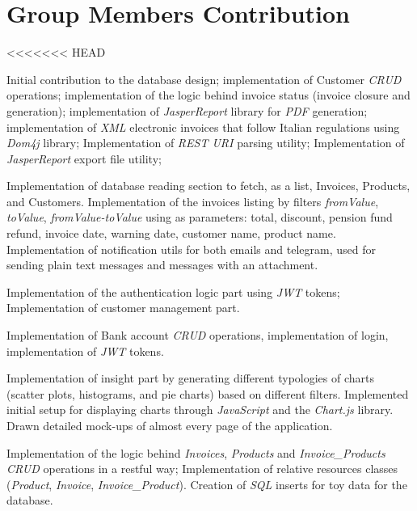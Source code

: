 \newpage
\section{Group Members Contribution}


\begin{description}
<<<<<<< HEAD
	\item[Mirco Cazzaro] Initial contribution to the database design; implementation of Customer \textit{CRUD} operations; implementation of the logic behind invoice status (invoice closure and generation); implementation of \textit{JasperReport} library for \textit{PDF} generation; implementation of \textit{XML} electronic invoices that follow Italian regulations using \textit{Dom4j} library; Implementation of \textit{REST URI} parsing utility; Implementation of \textit{JasperReport} export file utility;
	\item[Marco Martinelli] Implementation of database reading section to fetch, as a list, Invoices, Products, and Customers. 
    Implementation of the invoices listing by filters \textit{fromValue}, \textit{toValue}, \textit{fromValue-toValue} using as parameters: total, discount, pension fund refund, invoice date, warning date, customer name, product name.
    Implementation of notification utils for both emails and telegram, used for sending plain text messages and messages with an attachment.  
	\item[Farzad Shami] Implementation of the authentication logic part using \textit{JWT} tokens; Implementation of customer management part.
	\item[Nicola Boscolo Cegion] Implementation of Bank account \textit{CRUD} operations, implementation of login, implementation of \textit{JWT} tokens.
	\item[Christian Marchiori] Implementation of insight part by generating different typologies of charts (scatter plots, histograms, and pie charts) based on different filters. Implemented initial setup for displaying charts through \textit{JavaScript} and the \textit{Chart.js} library. Drawn detailed mock-ups of almost every page of the application.
	\item[Fabio Zanini] Implementation of the logic behind \textit{Invoices}, \textit{Products} and \textit{Invoice\_Products} \textit{CRUD} operations in a restful way; Implementation of relative resources classes (\textit{Product}, \textit{Invoice}, \textit{Invoice\_Product}). Creation of \textit{SQL} inserts for toy data for the database.

\end{description}
